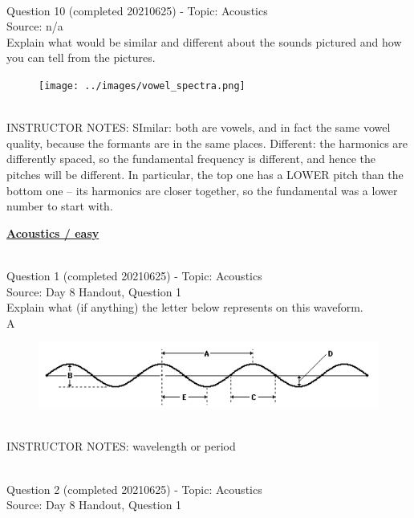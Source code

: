 \documentclass[12pt]{article}
\begin{document}
~\\

{\large Question 10} (completed 20210625) - Topic: Acoustics\\
Source: n/a\\

Explain what would be similar and different about the sounds pictured and how you can tell from the pictures.\\

\begin{figure}[H]
\texttt{[image: ../images/vowel\_spectra.png]}
\end{figure}

~\\
INSTRUCTOR NOTES: SImilar: both are vowels, and in fact the same vowel quality, because the formants are in the same places. Different: the harmonics are differently spaced, so the fundamental frequency is different, and hence the pitches will be different. In particular, the top one has a LOWER pitch than the bottom one -- its harmonics are closer together, so the fundamental was a lower number to start with.


\newpage\textbf{\underline{\huge Acoustics / easy\\}}

~\\

{\large Question 1} (completed 20210625) - Topic: Acoustics\\
Source: Day 8 Handout, Question 1\\

Explain what (if anything) the letter below represents on this waveform.\\

A

\begin{figure}[H]
\includegraphics{../images/sinusoid.png}
\end{figure}

~\\
INSTRUCTOR NOTES: wavelength or period


~\\

{\large Question 2} (completed 20210625) - Topic: Acoustics\\
Source: Day 8 Handout, Question 1\\
\end{document}

